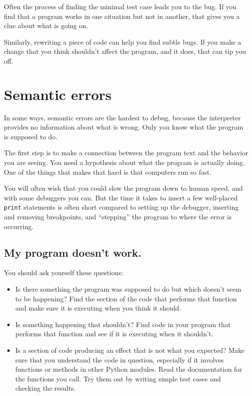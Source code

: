 Often the process of finding the minimal test case leads you to the
bug.  If you find that a program works in one situation but not in
another, that gives you a clue about what is going on.

Similarly, rewriting a piece of code can help you find subtle
bugs.  If you make a change that you think shouldn't affect the
program, and it does, that can tip you off.


\section{Semantic errors}

In some ways, semantic errors are the hardest to debug,
because the interpreter provides no information
about what is wrong.  Only you know what the program is supposed to
do.

The first step is to make a connection between the program
text and the behavior you are seeing.  You need a hypothesis
about what the program is actually doing.  One of the things
that makes that hard is that computers run so fast.

You will often wish that you could slow the program down to human
speed, and with some debuggers you can.  But the time it takes to
insert a few well-placed {\tt print} statements is often short compared to
setting up the debugger, inserting and removing breakpoints, and
``stepping'' the program to where the error is occurring.


\subsection{My program doesn't work.}

You should ask yourself these questions:

\begin{itemize}

\item Is there something the program was supposed to do but
which doesn't seem to be happening?  Find the section of the code
that performs that function and make sure it is executing when
you think it should.

\item Is something happening that shouldn't?  Find code in
your program that performs that function and see if it is
executing when it shouldn't.

\item Is a section of code producing an effect that is not
what you expected?  Make sure that you understand the code in
question, especially if it involves functions or methods in
other Python modules.  Read the documentation for the functions you call.
Try them out by writing simple test cases and checking the results.

\end{itemize}

